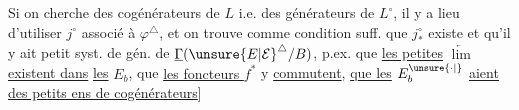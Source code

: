 Si on cherche des cogénérateurs de $L$
i.e. des générateurs de $L^\circ$, il y a lieu
d'utiliser $j^\circ$ associé à ${\varphi}^\triangle$, et on trouve
comme condition suff. que $j_*^\circ$ existe et qu'il
y ait petit syst. de gén. de $\underline{\Gamma}({\unsure{E|\mathcal E}}^\triangle/B)$,
p.ex. que \uline{les petites} $\underleftarrow{\lim}$ \uline{existent dans}
\uline{les} $E_b$, que \uline{les foncteurs $f^*$} y \uline{commutent},
\uline{que les} $E_b^{\unsure{\cdot|{}}}$ \uline{aient des petits ens de cogénérateurs}]

